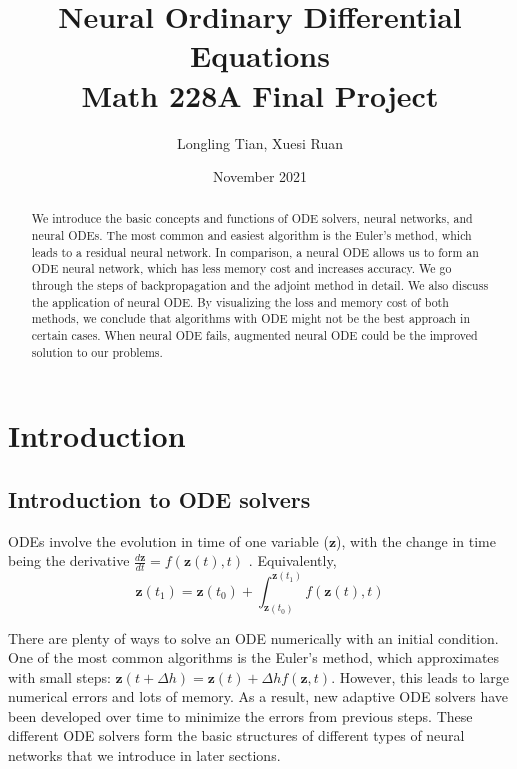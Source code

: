 \documentclass{article}
\title{%
Neural Ordinary Differential Equations \\
\large{Math 228A Final Project}}
\author{Longling Tian, Xuesi Ruan}
\date{November 2021}
\begin{document}
\maketitle

\begin{abstract}
    We introduce the basic concepts and functions of ODE solvers, neural networks, and neural ODEs. The most common and easiest algorithm is the Euler’s method, which leads to a residual neural network. In comparison, a neural ODE allows us to form an ODE neural network, which has less memory cost and increases accuracy. We go through the steps of backpropagation and the adjoint method in detail. We also discuss the application of neural ODE. By visualizing the loss and memory cost of both methods, we conclude that algorithms with ODE might not be the best approach in certain cases. When neural ODE fails, augmented neural ODE could be the improved solution to our problems.
\end{abstract}

\section{Introduction}

\subsection{Introduction to ODE solvers}

ODEs involve the evolution in time of one variable ($\mathbf{z}$), with the change in time being the derivative $\frac{d\mathbf{z}}{dt} = f(\mathbf{z}(t),t)$ {\cite{NODEvideo}}. Equivalently, $$\mathbf{z}(t_1) = \mathbf{z}(t_0) + \int_{\mathbf{z}(t_0)}^{\mathbf{z}(t_1)} f(\mathbf{z}(t), t)$$

There are plenty of ways to solve an ODE numerically with an initial condition. One of the most common algorithms is the Euler’s method, which approximates with small steps: $\mathbf{z}(t+\Delta h) = \mathbf{z}(t) + \Delta h f(\mathbf{z}, t)$.
However, this leads to large numerical errors and lots of memory. As a result, new adaptive ODE solvers have been developed over time to minimize the errors from previous steps. These different ODE solvers form the basic structures of different types of neural networks that we introduce in later sections.
\end{document}
